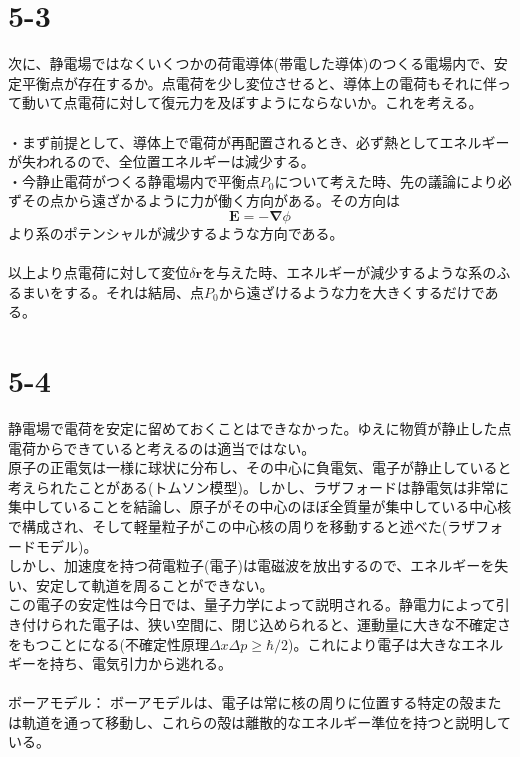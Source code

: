 \documentclass{jsarticle}
\begin{document}
\section*{5-3}
\noindent
次に、静電場ではなくいくつかの荷電導体(帯電した導体)のつくる電場内で、安定平衡点が存在するか。点電荷を少し変位させると、導体上の電荷もそれに伴って動いて点電荷に対して復元力を及ぼすようにならないか。これを考える。\\
\\
・まず前提として、導体上で電荷が再配置されるとき、必ず熱としてエネルギーが失われるので、全位置エネルギーは減少する。\\
・今静止電荷がつくる静電場内で平衡点\(P_{0}\)について考えた時、先の議論により必ずその点から遠ざかるように力が働く方向がある。その方向は
\[\bm{E}=-\bm{\nabla}\phi\]
より系のポテンシャルが減少するような方向である。\\
\\
以上より点電荷に対して変位\(\delta\bm{r}\)を与えた時、エネルギーが減少するような系のふるまいをする。それは結局、点\(P_{0}\)から遠ざけるような力を大きくするだけである。


\newpage
\section*{5-4}
\noindent
静電場で電荷を安定に留めておくことはできなかった。ゆえに物質が静止した点電荷からできていると考えるのは適当ではない。\\
原子の正電気は一様に球状に分布し、その中心に負電気、電子が静止していると考えられたことがある(トムソン模型)。しかし、ラザフォードは静電気は非常に集中していることを結論し、原子がその中心のほぼ全質量が集中している中心核で構成され、そして軽量粒子がこの中心核の周りを移動すると述べた(ラザフォードモデル)。\\
しかし、加速度を持つ荷電粒子(電子)は電磁波を放出するので、エネルギーを失い、安定して軌道を周ることができない。\\
この電子の安定性は今日では、量子力学によって説明される。静電力によって引き付けられた電子は、狭い空間に、閉じ込められると、運動量に大きな不確定さをもつことになる(不確定性原理\(\Delta x\Delta p\geq\hbar/2\))。これにより電子は大きなエネルギーを持ち、電気引力から逃れる。\\
\\
ボーアモデル： ボーアモデルは、電子は常に核の周りに位置する特定の殻または軌道を通って移動し、これらの殻は離散的なエネルギー準位を持つと説明している。\\
\end{document}
